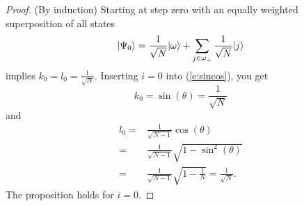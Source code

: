 \begin{proof}
(By induction)  
Starting at step zero with an equally weighted 
superposition of all states
\begin{equation}
{|{\Psi_0}\rangle} = \frac{1}{\sqrt{N}}{|{\omega}\rangle} 
                + \sum_{j\in\omega_\perp}\frac{1}{\sqrt{N}}{|{j}\rangle}
\end{equation}
implies $k_0 = l_0 = \frac{1}{\sqrt{N}}$.
Inserting $i=0$ into (\ref{e:sincos}), you get
\begin{equation}
k_0 = \sin\left(\theta\right) = \frac{1}{\sqrt{N}}
\end{equation}
and 
\begin{equation}
\begin{split}
l_0 =& \frac{1}{\sqrt{N-1}}\cos\left(\theta\right)\\
    =& \frac{1}{\sqrt{N-1}}\sqrt{ 1 - \sin^2\left(\theta\right) }\\
    =& \frac{1}{\sqrt{N-1}}\sqrt{ 1 - \frac{1}{N} }
    = \frac{1}{\sqrt{N}}.
\end{split}
\end{equation}
The proposition holds for $i=0$.


\end{proof}
